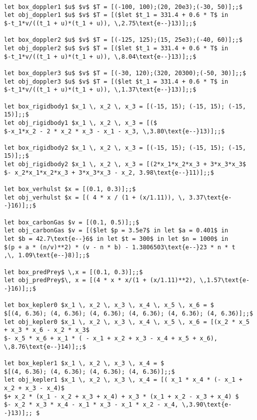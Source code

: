 {\scriptsize
\begin{lstlisting}

let box_doppler1 $u$ $v$ $T = [(-100, 100);(20, 20e3);(-30, 50)];;$ 
let obj_doppler1 $u$ $v$ $T = [($let $t_1 = 331.4 + 0.6 * T$ in 
$-t_1*v/((t_1 + u)*(t_1 + u)), \,2.75\text{e--}13)];;$

let box_doppler2 $u$ $v$ $T = [(-125, 125);(15, 25e3);(-40, 60)];;$ 
let obj_doppler2 $u$ $v$ $T = [($let $t_1 = 331.4 + 0.6 * T$ in 
$-t_1*v/((t_1 + u)*(t_1 + u)), \,8.04\text{e--}13)];;$

let box_doppler3 $u$ $v$ $T = [(-30, 120);(320, 20300);(-50, 30)];;$ 
let obj_doppler3 $u$ $v$ $T = [($let $t_1 = 331.4 + 0.6 * T$ in 
$-t_1*v/((t_1 + u)*(t_1 + u)), \,1.37\text{e--}13)];;$

let box_rigidbody1 $x_1 \, x_2 \, x_3 = [(-15, 15); (-15, 15); (-15, 15)];;$
let obj_rigidbody1 $x_1 \, x_2 \, x_3 = [($
$-x_1*x_2 - 2 * x_2 * x_3 - x_1 - x_3, \,3.80\text{e--}13)];;$

let box_rigidbody2 $x_1 \, x_2 \, x_3 = [(-15, 15); (-15, 15); (-15, 15)];;$
let obj_rigidbody2 $x_1 \, x_2 \, x_3 = [(2*x_1*x_2*x_3 + 3*x_3*x_3$ 
$- x_2*x_1*x_2*x_3 + 3*x_3*x_3 - x_2, 3.98\text{e--}11)];;$

let box_verhulst $x = [(0.1, 0.3)];;$
let obj_verhulst $x = [( 4 * x / (1 + (x/1.11)), \, 3.37\text{e--}16)];;$

let box_carbonGas $v = [(0.1, 0.5)];;$
let obj_carbonGas $v = [($let $p = 3.5e7$ in let $a = 0.401$ in 
let $b = 42.7\text{e--}6$ in let $t = 300$ in let $n = 1000$ in
$(p + a * (n/v)**2) * (v - n * b) - 1.3806503\text{e--}23 * n * t
,\, 1.09\text{e--}8)];;$

let box_predPrey$ \,x = [(0.1, 0.3)];;$
let obj_predPrey$\, x = [(4 * x * x/(1 + (x/1.11)**2), \,1.57\text{e--}16)];;$

let box_kepler0 $x_1 \, x_2 \, x_3 \, x_4 \, x_5 \, x_6 = $
$[(4, 6.36); (4, 6.36); (4, 6.36); (4, 6.36); (4, 6.36); (4, 6.36)];;$
let obj_kepler0 $x_1 \, x_2 \, x_3 \, x_4 \, x_5 \, x_6 = [(x_2 * x_5 + x_3 * x_6 - x_2 * x_3$
$- x_5 * x_6 + x_1 * ( - x_1 + x_2 + x_3 - x_4 + x_5 + x_6), \,8.76\text{e--}14)];;$

let box_kepler1 $x_1 \, x_2 \, x_3 \, x_4 = $
$[(4, 6.36); (4, 6.36); (4, 6.36); (4, 6.36)];;$
let obj_kepler1 $x_1 \, x_2 \, x_3 \, x_4 = [( x_1 * x_4 * (- x_1 + x_2 + x_3 - x_4)$
$+ x_2 * (x_1 - x_2 + x_3 + x_4) + x_3 * (x_1 + x_2 - x_3 + x_4) $
$- x_2 * x_3 * x_4 - x_1 * x_3 - x_1 * x_2 - x_4, \,3.90\text{e--}13)];; $


\end{lstlisting}}

